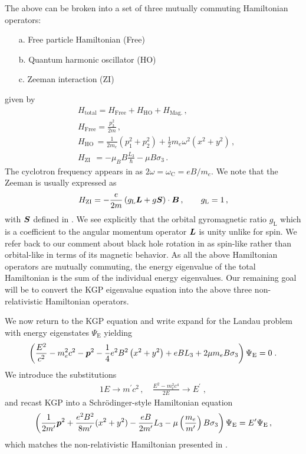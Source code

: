 The above can be broken into a set of three mutually commuting Hamiltonian operators:
\begin{itemize}[nosep]
    \item[a.] Free particle Hamiltonian (Free)
    \item[b.] Quantum harmonic oscillator (HO)
    \item[c.] Zeeman interaction (ZI)
\end{itemize}
given by
\begin{align}
	\label{homogeneous:7}
    &H_\mathrm{total}=H_\mathrm{Free}+H_\mathrm{HO}+H_\mathrm{Mag.}\,,\\
	\label{homogeneous:7a}
    &H_{\mathrm{Free}}=\frac{p_{3}^{2}}{2m}\,,\\
	\label{homogeneous:7b}
    &H_\mathrm{HO}\,=\frac{1}{2m_{e}}\left(p_{1}^{2}+p_{2}^{2}\right) + \frac{1}{2}m_{e}\omega^{2}(x^{2}+y^{2})\,,\\
	\label{homogeneous:7c}
    &H_{\mathrm{ZI}}\ \,=-\mu_{B}B\frac{L_{3}}{\hbar}-\mu B\sigma_{3}\,.
\end{align}
The cyclotron frequency appears in  as $2\omega=\omega_\mathrm{C}=eB/m_{e}$. We note that the Zeeman  is usually expressed as
\begin{alignat}{1}
	\label{homogeneous:7d}
    H_{\mathrm{ZI}}=-\frac{e}{2m}\left(g_\mathrm{L}\boldsymbol{L}+g\boldsymbol{S}\right)\cdot\boldsymbol{B}\,,\qquad g_\mathrm{L}=1\,,
\end{alignat}
with $\boldsymbol{S}$ defined in . We see explicitly that the orbital gyromagnetic ratio $g_\mathrm{L}$ which is a coefficient to the angular momentum operator $\boldsymbol{L}$ is unity unlike for spin. We refer back to our comment about black hole rotation in  as spin-like rather than orbital-like in terms of its magnetic behavior. As all the above Hamiltonian operators are mutually commuting, the energy eigenvalue of the total Hamiltonian is the sum of the individual energy eigenvalues. Our remaining goal will be to convert the KGP eigenvalue equation into the above three non-relativistic Hamiltonian operators. 

We now return to the KGP equation and write expand  for the Landau problem with energy eigenstates $\Psi_\mathrm{E}$ yielding
\begin{alignat}{1}
    \label{lan09}
    \left(\frac{E^{2}}{c^{2}}-m_{e}^{2}c^{2}-\boldsymbol{p}^{2}-\frac{1}{4}e^{2}B^{2}\left(x^{2}+y^{2}\right)+eBL_{3}+2\mu m_{e} B\sigma_{3}\right)\Psi_\mathrm{E}=0\;.
\end{alignat} 
We introduce the substitutions 
\begin{alignat}{1}
    \label{lan10}
    E\to m^\prime c^{2}\,,\quad \frac{E^{2}-m_{e}^{2}c^{4}}{2E}\to E^\prime\;,
\end{alignat} 
and recast KGP  into a Schr{\"o}dinger-style Hamiltonian equation
\begin{gather}
	\label{lan11} \left(\frac{1}{2m'}\boldsymbol{p}^{2}+\frac{e^{2}B^{2}}{8m'}(x^{2}+y^{2})-\frac{eB}{2m'}L_{3}-\mu\left(\frac{m_{e}}{m'}\right)B\sigma_{3}\right)\Psi_\mathrm{E}=E'\Psi_\mathrm{E}\,,
\end{gather}
which matches the non-relativistic Hamiltonian presented in .

